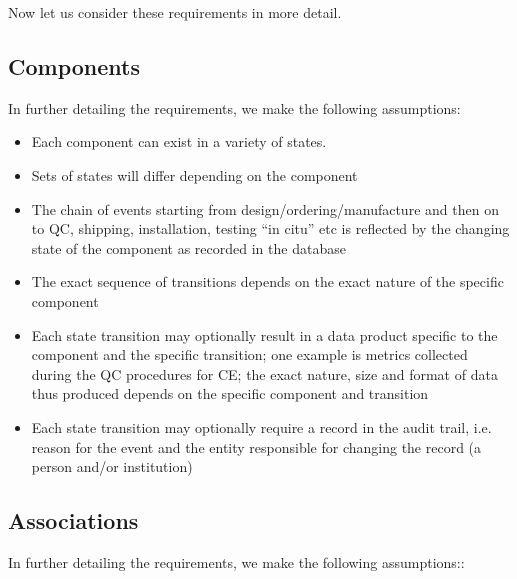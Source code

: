 \documentclass[pdftex,12pt,letter]{article}
\begin{document}
\noindent Now let us consider these requirements in more detail.

\subsection{Components}
In further detailing the requirements, we make the following assumptions:

\begin{itemize}

\item Each component can exist in a variety of states.

\item Sets of states will differ depending on the component

\item The chain of events starting from design/ordering/manufacture and then on to QC,
shipping, installation, testing ``in citu'' etc is reflected by the changing state of the component as recorded
in the database

\item The exact sequence of transitions depends on the exact nature of the specific  component

\item Each state transition may optionally result in a data product specific to the component and the specific transition;
one example is metrics collected during the QC procedures for CE; the exact nature, size and format of data thus produced
depends on the specific component and transition

\item Each state transition may optionally require a record in the audit trail, i.e.\,reason for the event and the entity
responsible for changing the record (a person and/or institution)

\end{itemize}

\subsection{Associations}
In further detailing the requirements, we make the following assumptions::
\end{document}
